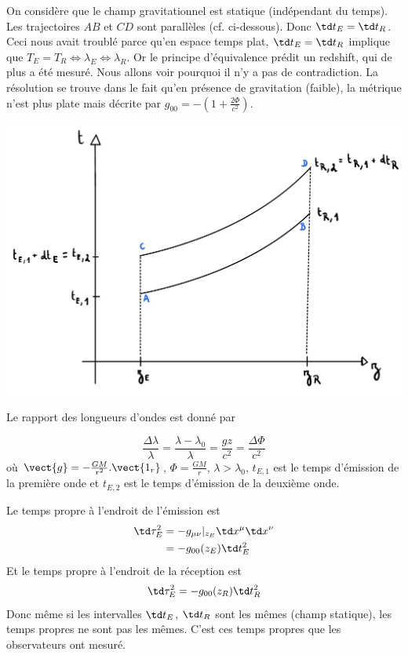 On considère que le champ gravitationnel est statique (indépendant du temps). Les trajectoires $AB$ et $CD$ sont parallèles (cf. ci-dessous). Donc $\td t_{E} = \td t_{R}$. Ceci nous avait troublé parce qu'en espace temps plat, $\td t_{E} = \td t_{R}$ implique que $T_E = T_R \Leftrightarrow \lambda_E \Leftrightarrow \lambda_R$. Or le principe d'équivalence prédit un redshift, qui de plus a été mesuré. Nous allons voir pourquoi il n'y a pas de contradiction. La résolution se trouve dans le fait qu'en présence de gravitation (faible), la métrique n'est plus plate mais décrite par $g_{00} = -\left(1 + \frac{2\Phi}{c^2}\right)$.

\begin{center} \includegraphics[scale=0.15]{Chapitres/5. Géodésiques/Images/redshift.jpg}  
\end{center}

Le rapport des longueurs d'ondes est donné par 

\begin{equation}
    \frac{\Delta \lambda}{\lambda} = \frac{\lambda -\lambda_0}{\lambda} = \frac{gz}{c^2}=\frac{\Delta \Phi}{c^2}
\end{equation}
où $\vect{g} = -\frac{GM}{r^2}.\vect{1_{r}}$, $\Phi = \frac{GM}{r}$, $\lambda > \lambda_0$, $t_{E, 1}$ est le temps d'émission de la première onde et $t_{E, 2}$ est le temps d'émission de la deuxième onde. 

Le temps propre à l'endroit de l'émission est 
\begin{align}
    \td \tau_E^2 &= -g_{\mu \nu}|_{z_E}\td x^{\mu}\td x^{\nu}\\
    &= - g_{0 0}(z_E)\td t^2_E
\end{align}
Et le temps propre à l'endroit de la réception est 
\begin{align}
    \td \tau_E^2 = - g_{0 0}(z_R)\td t^2_R
\end{align}
Donc même si les intervalles $\td t_E$, $\td t_R$ sont les mêmes (champ statique), les temps propres ne sont pas les mêmes. C'est ces temps propres que les observateurs ont mesuré. 

